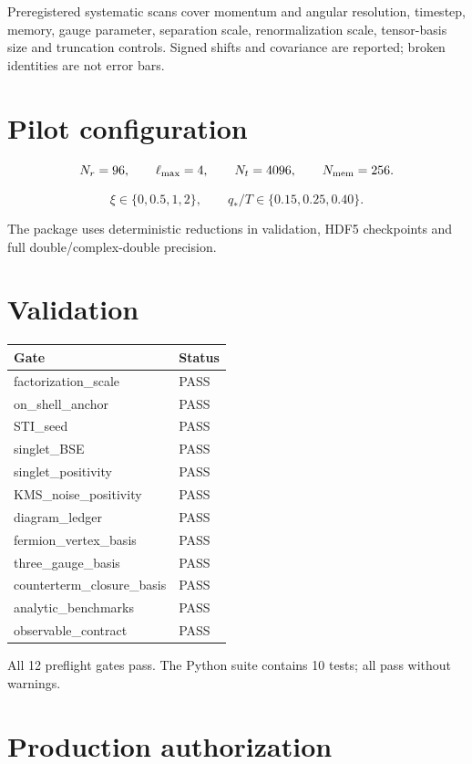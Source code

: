 \documentclass[
  10pt,
]{article}
\begin{document}
Preregistered systematic scans cover momentum and angular resolution,
timestep, memory, gauge parameter, separation scale, renormalization
scale, tensor-basis size and truncation controls. Signed shifts and
covariance are reported; broken identities are not error bars.

\section{Pilot configuration}\label{pilot-configuration}

\[
N_r=96,\qquad\ell_{\max}=4,\qquad N_t=4096,\qquad N_{\rm mem}=256.
\]

\[
\xi\in\{0,0.5,1,2\},\qquad q_*/T\in\{0.15,0.25,0.40\}.
\]

The package uses deterministic reductions in validation, HDF5
checkpoints and full double/complex-double precision.

\section{Validation}\label{validation}

\begin{longtable}[]{@{}ll@{}}
\toprule\noalign{}
Gate & Status \\
\midrule\noalign{}
\endhead
\bottomrule\noalign{}
\endlastfoot
factorization\_scale & PASS \\
on\_shell\_anchor & PASS \\
STI\_seed & PASS \\
singlet\_BSE & PASS \\
singlet\_positivity & PASS \\
KMS\_noise\_positivity & PASS \\
diagram\_ledger & PASS \\
fermion\_vertex\_basis & PASS \\
three\_gauge\_basis & PASS \\
counterterm\_closure\_basis & PASS \\
analytic\_benchmarks & PASS \\
observable\_contract & PASS \\
\end{longtable}

All 12 preflight gates pass. The Python suite contains 10 tests; all
pass without warnings.

\section{Production authorization}\label{production-authorization}
\end{document}
